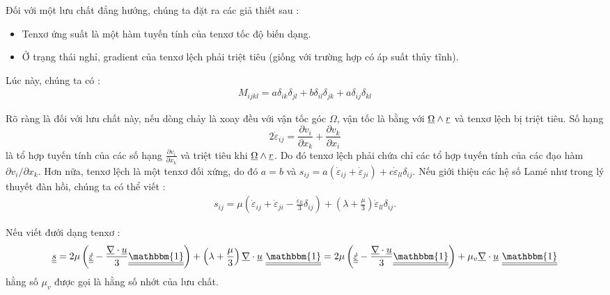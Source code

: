 \documentclass[CO_LUU_CHAT_NANG_CAO.tex]{subfiles}
\begin{document}
Đối với một lưu chất đẳng hướng, chúng ta đặt ra các giả thiết sau :
\begin{itemize}
    \item Tenxơ ứng suất là một hàm tuyến tính của tenxơ tốc độ biến dạng.
    \item Ở trạng thái nghỉ, gradient của tenxơ lệch phải triệt tiêu (giống với trường hợp có áp suất thủy tĩnh).
\end{itemize}
Lúc này, chúng ta có :
\begin{equation}
    \begin{aligned}
        M_{ijkl}=a\delta_{ik}\delta_{jl}+b\delta_{il}\delta_{jk}+a\delta_{ij}\delta_{kl}
    \end{aligned}
\end{equation}

Rõ ràng là đối với lưu chất này, nếu dòng chảy là xoay đều với vận tốc góc $\Omega$, vận tốc là bằng với $\underline{\Omega} \wedge \underline{r}$ và tenxơ lệch bị triệt tiêu. Số hạng 
\[2{\dot{\varepsilon}}_{ij}=\frac{{\partial {v_i}}}{{\partial {x_k}}} + \frac{{\partial {v_k}}}{{\partial {x_i}}}\]
là tổ hợp tuyến tính của các số hạng $\displaystyle\frac{{\partial {v_i}}}{{\partial {x_k}}}$ và triệt tiêu khi $\underline{\Omega} \wedge \underline{r}$. Do đó tenxơ lệch phải chứa chỉ các tổ hợp tuyến tính của các đạo hàm $\partial {v_i}/\partial {x_k}$. Hơn nữa, tenxơ lệch là một tenxơ đối xứng, do đó $a=b$ và ${s_{ij}} = a\left( {{{\dot \varepsilon }_{ij}} + {{\dot \varepsilon }_{ji}}} \right) + c{\dot \varepsilon _{ll}}{\delta _{ij}}$. Nếu giới thiệu các hệ số Lamé như trong lý thuyết đàn hồi, chúng ta có thể viết :
\begin{equation}
    \begin{aligned}
        s_{ij}=\mu({\dot{\varepsilon}}_{ij}+{\dot{\varepsilon}}_{ji}-\frac{{\dot{\varepsilon}}_{ll}}{3}\delta_{ij})+(\lambda+\frac{\mu}{3})\dot{\varepsilon}_{ll}\delta_{ij}.
    \end{aligned}
\end{equation}

Nếu viết đưới dạng tenxơ :
\begin{equation}
    \begin{aligned}
        \underline{\underline s}  = 2\mu \left( {\underline{\underline {\dot \varepsilon }}  - \frac{{\underline \nabla   \cdot \underline u }}{3}\underline{\underline {\mathbbm{1}}} } \right) + \left( {\lambda  + \frac{\mu }{3}} \right)\underline \nabla   \cdot \underline u \text{ }\underline{\underline {\mathbbm{1}}}  = 2\mu \left( {\underline{\underline {\dot \varepsilon }}  - \frac{{\underline \nabla   \cdot \underline u }}{3}\underline{\underline {\mathbbm{1}}} } \right) + {\mu _v}\underline \nabla   \cdot \underline u \text{ } \underline{\underline{\mathbbm{1}}}
    \end{aligned}
\end{equation}
hằng số $\mu_v$ được gọi là hằng số nhớt của lưu chất.
\end{document}
